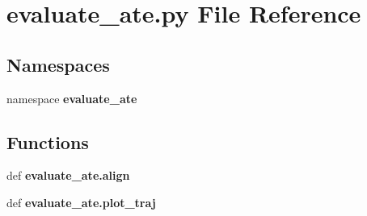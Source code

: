 \section{evaluate\-\_\-ate.\-py \-File \-Reference}
\label{evaluate__ate_8py}
\subsection*{\-Namespaces}
\begin{DoxyCompactItemize}
\item 
namespace {\bf evaluate\-\_\-ate}
\end{DoxyCompactItemize}
\subsection*{\-Functions}
\begin{DoxyCompactItemize}
\item 
def {\bf evaluate\-\_\-ate.\-align}
\item 
def {\bf evaluate\-\_\-ate.\-plot\-\_\-traj}
\end{DoxyCompactItemize}
